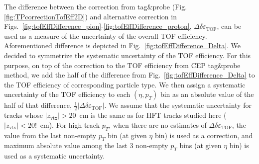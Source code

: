 The difference between the correction from tag\&probe (Fig.\ref{fig:TPcorrectionTofEff2D}) and alternative correction in Figs.~\ref{fig:tofEffDifference_pion}-\ref{fig:tofEffDifference_proton}, $\Delta\delta\varepsilon_{\text{TOF}}$, can be used as a measure of the uncertainty of the overall TOF efficiency. Aforementioned difference is depicted in Fig.~\ref{fig:tofEffDifference_Delta}. We decided to symmetrize the systematic uncertainty of the TOF efficiency. For this purpose, on top of the correction to the TOF efficiency from CEP tag\&probe method, we add the half of the difference from Fig.~\ref{fig:tofEffDifference_Delta} to the TOF efficiency of corresponding particle type. We then assign a systematic uncertainty of the TOF efficiency to each $(\eta,p_{T})$ bin as an absolute value of the half of that difference, $\frac{1}{2}|\Delta\delta\varepsilon_{\text{TOF}}|$. We assume that the systematic uncertainty for tracks whose $|z_{\text{vtx}}|>20$~cm is the same as for HFT tracks studied here ($|z_{\text{vtx}}|<20$!~cm). For high track $p_{T}$, when there are no estimates of $\Delta\delta\varepsilon_{\text{TOF}}$, the value from the last non-empty $p_{T}$ bin (at given $\eta$ bin) is used as a correction, and maximum absolute value among the last 3 non-empty $p_{T}$ bins (at given $\eta$ bin) is used as a systematic uncertainty.

